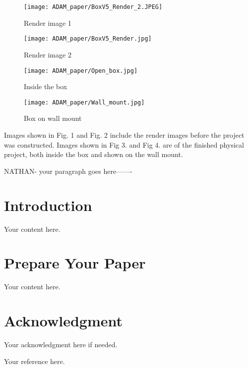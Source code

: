 \documentclass[conference]{IEEEtran}
\begin{document}
\begin{figure}
\label{fig-renders}
  \centering
  \begin{minipage}[b]{0.2\textwidth}
    \texttt{[image: ADAM\_paper/BoxV5\_Render\_2.JPEG]}
    \caption{Render image 1}
  \end{minipage}
  \hfill
  \begin{minipage}[b]{0.25\textwidth}
    \texttt{[image: ADAM\_paper/BoxV5\_Render.jpg]}
    \caption{Render image 2}
  \end{minipage}
\end{figure}

\begin{figure}[H]
\label{fig-images}
  \centering
  \begin{minipage}[b]{0.2\textwidth}
    \texttt{[image: ADAM\_paper/Open\_box.jpg]}
    \caption{Inside the box}
  \end{minipage}
  \hfill
  \begin{minipage}[b]{0.2\textwidth}
    \texttt{[image: ADAM\_paper/Wall\_mount.jpg]}
    \caption{Box on wall mount}
  \end{minipage}
\end{figure}

Images shown in Fig. 1 and Fig. 2 include the render images before the project was constructed. Images shown in Fig 3. and Fig 4. are of the finished physical project, both inside the box and shown on the wall mount.

NATHAN- your paragraph goes here-------

\section{Introduction}
Your content here.

\section{Prepare Your Paper}
Your content here.

\section*{Acknowledgment}
Your acknowledgment here if needed.


\begin{thebibliography}{00}
 Your reference here.
\end{thebibliography}
\end{document}

